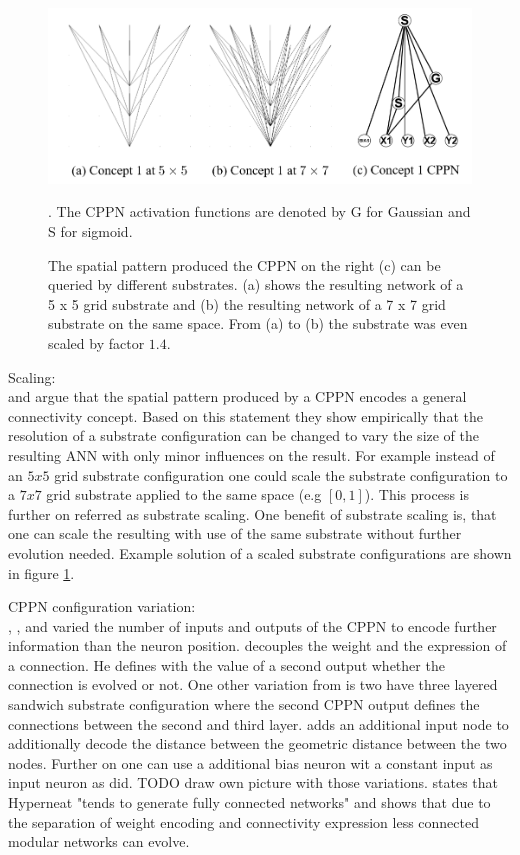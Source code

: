 \begin{figure}[tb]
	\centering
	\includegraphics[width=0.7\linewidth]{figures/HyperNeat/scaling}
	\caption[Exemplar substrate scaling]{ The spatial pattern produced the CPPN on the right (c) can be queried by different substrates. (a) shows the resulting network of a 5 x 5 grid substrate and (b) the resulting network of a 7 x 7 grid substrate on the same space. From (a) to (b) the substrate was even scaled by factor $1.4$.  \cite[p. 14]{HyperNEAT}}. The CPPN activation functions are denoted by G for Gaussian and S for sigmoid.
	\label{fig:scaling}
\end{figure}

Scaling:\\
 \cite{HyperNEAT} and \cite{HyperNEATOctobusArm} argue that the spatial pattern produced by a CPPN encodes a general connectivity concept. Based on this statement they show empirically that the resolution of a substrate configuration can be changed to vary the size of the resulting ANN with only minor influences on the result. For example instead of an $5x5$ grid substrate configuration one could scale the substrate configuration to a $7x7$ grid substrate applied to the same space (e.g $[0,1]$). This process is further on referred as substrate scaling. One benefit of substrate scaling is, that one can scale the resulting with use of the same substrate without further evolution needed. Example solution of a scaled substrate configurations are shown in figure \ref{fig:scaling}.
 
 CPPN configuration variation: \\
 \cite{HyperNEATOctobusArm}, \cite{HyperNEATLeo},\cite{HyperNEATEvolveLearningRules} and \cite{HyperNeat1DSubstrates} varied the number of inputs and outputs of the CPPN to encode further information than the neuron position. \cite{HyperNEATLeo} decouples the weight and the expression of a connection. He defines with the value of a second output whether the connection is evolved or not. One other variation from \cite{HyperNEATOctobusArm}  is two have three layered sandwich substrate configuration where the second CPPN output defines the connections between the second and third layer.\cite{HyperNEAT} adds an additional input node to additionally decode the distance between the geometric distance between the two nodes. Further on one can use a additional bias neuron wit a constant input as input neuron as \cite{HyperNEATEvolveLearningRules} did. TODO draw own picture with those variations.  \cite{HyperNEATLeo} states that Hyperneat "tends to generate fully connected networks" and shows that due to the separation of weight encoding and connectivity expression less connected modular networks can evolve.
 
